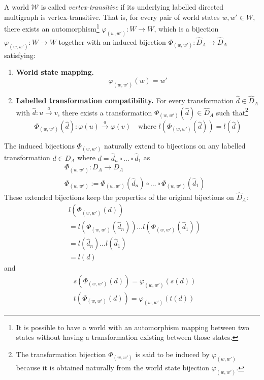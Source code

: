 \begin{definition}
A world $\mathscr{W}$ is called \emph{vertex-transitive} if its underlying labelled directed multigraph is vertex-transitive.
That is, for every pair of world states $w, w' \in W$, there exists an automorphism\footnote{
It is possible to have a world with an automorphism mapping between two states without having a transformation existing between those states.
} $\varphi_{(w,w')}: W \to W$, which is a bijection $\varphi_{(w,w')}: W \to W$ together with an induced bijection $\Phi_{(w, w')}: \hat{D}_{A} \to \hat{D}_{A}$ satisfying:
\begin{enumerate}
    \item \textbf{World state mapping.}
    \begin{equation}
        \varphi_{(w,w')}(w) = w'
    \end{equation}
    \item \textbf{Labelled transformation compatibility.}
    For every transformation $\hat{d} \in \hat{D}_{A}$ with $\hat{d}: u \xrightarrow{a} v$, there exists a transformation $\Phi_{(w, w')}(\hat{d}) \in \hat{D}_{A}$ such that\footnote{
    The transformation bijection $\Phi_{(w, w')}$ is said to be induced by $\varphi_{(w,w')}$ because it is obtained naturally from the world state bijection $\varphi_{(w,w')}$.
    }
    \begin{equation}
        \Phi_{(w, w')}(\hat{d}): \varphi(u) \xrightarrow{a} \varphi(v) \quad \text{where $l(\Phi_{(w, w')}(\hat{d})) = l(\hat{d})$}
    \end{equation}
\end{enumerate}
\end{definition}

The induced bijections $\Phi_{(w, w')}$ naturally extend to bijections on any labelled transformation $d \in D_{A}$ where $d = \hat{d}_{n} \circ \dots \circ \hat{d}_{1}$ as
\begin{align}
    & \Phi_{(w, w')}: D_{A} \to D_{A} \\
    & \Phi_{(w, w')} := \Phi_{(w, w')}(\hat{d}_{n}) \circ \dots \circ \Phi_{(w, w')}(\hat{d}_{1})
\end{align}
These extended bijections keep the properties of the original bijections on $\hat{D}_{A}$:
\begin{align}
    & l(\Phi_{(w, w')}(d)) \\
    & = l(\Phi_{(w, w')}(\hat{d}_{n})) \dots l(\Phi_{(w, w')}(\hat{d}_{1})) \\
    & = l(\hat{d}_{n}) \dots l(\hat{d}_{1}) \\
    & = l(d)
\end{align}
and
\begin{align}
    & s(\Phi_{(w, w')}(d)) = \varphi_{(w,w')}(s(d)) \\
    & t(\Phi_{(w, w')}(d)) = \varphi_{(w,w')}(t(d))
\end{align}




